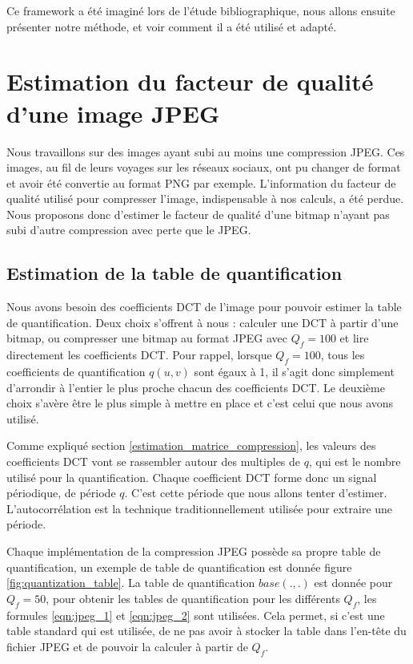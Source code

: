 \documentclass[utf8,final]{stageM2R} %
\begin{document}
Ce framework a été imaginé lors de l'étude bibliographique, nous allons ensuite présenter notre méthode, et voir comment il a été utilisé et adapté.


\section{Estimation du facteur de qualité d'une image JPEG}
Nous travaillons sur des images ayant subi au moins une compression JPEG. Ces images, au fil de leurs voyages sur les réseaux sociaux, ont pu changer de format et avoir été convertie au format PNG par exemple. L'information du facteur de qualité utilisé pour compresser l'image, indispensable à nos calculs, a été perdue. Nous proposons donc d'estimer le facteur de qualité d'une bitmap n'ayant pas subi d'autre compression avec perte que le JPEG.

\subsection{Estimation de la table de quantification}
\label{sec:extraction}
Nous avons besoin des coefficients DCT de l'image pour pouvoir estimer la table de quantification. Deux choix s'offrent à nous : calculer une DCT à partir d'une bitmap, ou compresser une bitmap au format JPEG avec $Q_f = 100$ et lire directement les coefficients DCT. Pour rappel, lorsque $Q_f = 100$, tous les coefficients de quantification $q(u,v)$ sont égaux à 1, il s'agit donc simplement d'arrondir à l'entier le plus proche chacun des coefficients DCT. Le deuxième choix s'avère être le plus simple à mettre en place et c'est celui que nous avons utilisé.

Comme expliqué section \ref{estimation_matrice_compression}, les valeurs des coefficients DCT vont se rassembler autour des multiples de $q$, qui est le nombre utilisé pour la quantification. Chaque coefficient DCT forme donc un signal périodique, de période $q$. C'est cette période que nous allons tenter d'estimer. L'autocorrélation est la technique traditionnellement utilisée pour extraire une période.

Chaque implémentation de la compression JPEG possède sa propre table de quantification, un exemple de table de quantification est donnée figure \ref{fig:quantization_table}. La table de quantification $base(.,.)$ est donnée pour $Q_f = 50$, pour obtenir les tables de quantification pour les différents $Q_f$, les formules \ref{eqn:jpeg_1} et \ref{eqn:jpeg_2} sont utilisées. Cela permet, si c'est une table standard qui est utilisée, de ne pas avoir à stocker la table dans l'en-tête du fichier JPEG et de pouvoir la calculer à partir de $Q_f$.
\end{document}
